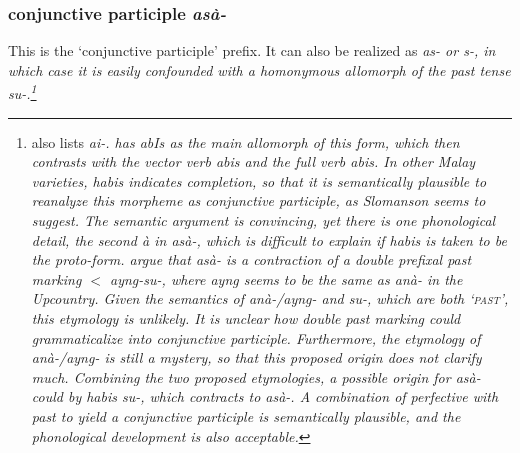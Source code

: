 
 

\subsubsection{conjunctive participle \em asà-\em}\label{sec:morph:asa-}
This is the `conjunctive participle' prefix. It can also be realized as \em as- \em or \em s-\em, in which case it is easily confounded with a homonymous allomorph of the past tense \em su-\em.\footnote{\citet[53,57]{Saldin2001}
 also lists \em ai-\em. \citet{Slomanson2006cll,Slomanson2008lingua} has \em abIs \em as the main allomorph of this form, which then contrasts with the vector verb \em abis \em and the full verb \em abis\em. In other Malay varieties, \em habis \em indicates completion, so that it is semantically plausible to reanalyze this morpheme as conjunctive participle, as Slomanson seems to suggest. The semantic argument is convincing, yet there is one phonological detail, the second \em à \em in \em asà-\em, which is difficult to explain if \em habis \em is taken to be the proto-form.  \citet[167]{SmithEtAl2006cll} argue that \em asà- \em is a contraction of a double prefixal past marking $<$ \em ayng-su-\em, where \em ayng \em seems to be the same as \em anà- \em in the Upcountry. Given the semantics of \em anà-/ayng- \em and \em su-\em, which are both `\textsc{past}', this etymology is unlikely. It is unclear how double past marking could grammaticalize into conjunctive participle. Furthermore, the etymology of \em anà-/ayng- \em is still a mystery, so that this proposed origin does not clarify much. Combining the two proposed etymologies, a possible origin for \em asà- \em could by \em *habis su-\em, which contracts to \em asà-\em. A combination of perfective with past to yield a conjunctive participle is semantically plausible, and the phonological development is also acceptable.}

